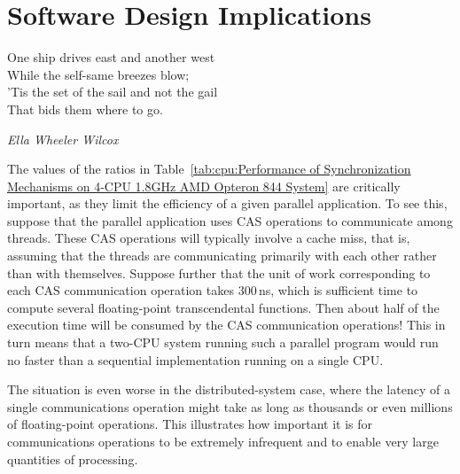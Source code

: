 
\section{Software Design Implications}
\label{sec:cpu:Software Design Implications}
%
\epigraph{One ship drives east and another west \\
	  While the self-same breezes blow; \\
	  'Tis the set of the sail and not the gail \\
	  That bids them where to go.}
	 {\emph{Ella Wheeler Wilcox}}

The values of the ratios in
Table~\ref{tab:cpu:Performance of Synchronization Mechanisms on 4-CPU 1.8GHz AMD Opteron 844 System}
are critically important, as they limit the
efficiency of a given parallel application.
To see this, suppose that the parallel application uses CAS
operations to communicate among threads.
These CAS operations will typically involve a cache miss, that is, assuming
that the threads are communicating primarily with each other rather than
with themselves.
Suppose further that the unit of work corresponding to each CAS communication
operation takes 300\,ns, which is sufficient time to compute several
floating-point transcendental functions.
Then about half of the execution time will be consumed by the CAS
communication operations!
This in turn means that a two-CPU system running such a parallel program
would run no faster than a sequential implementation running on a
single CPU.

The situation is even worse in the distributed-system case, where the
latency of a single communications operation might take as long as
thousands or even millions of floating-point operations.
This illustrates how important it is for communications operations to
be extremely infrequent and to enable very large quantities of processing.

